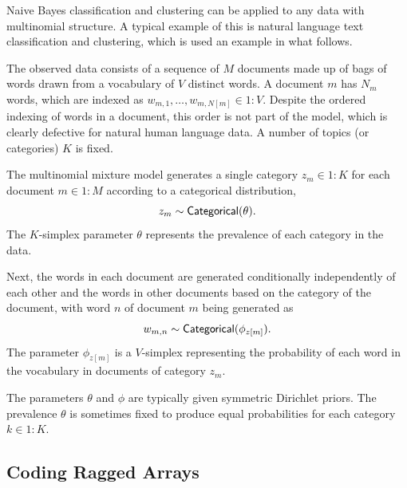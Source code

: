 Naive Bayes classification and clustering can be applied to any data
with multinomial structure.  A typical example of this is natural
language text classification and clustering, which is used an example
in what follows.

The observed data consists of a sequence of $M$ documents made up of
bags of words drawn from a vocabulary of $V$ distinct words.  A
document $m$ has $N_m$ words, which are indexed as $w_{m,1}, \ldots,
w_{m,N[m]} \in 1{:}V$.  Despite the ordered indexing of words in a
document, this order is not part of the model, which is clearly
defective for natural human language data.  A number of topics (or
categories) $K$ is fixed.

The multinomial mixture model generates a single category $z_m \in
1{:}K$ for each document $m \in 1{:}M$ according to a categorical
distribution,
\[
z_m \sim \mbox{\sf Categorical}(\theta).
\]
The $K$-simplex parameter $\theta$ represents the prevalence of each
category in the data.

Next, the words in each document are generated conditionally
independently of each other and the words in other documents based on
the category of the document, with word $n$ of document $m$ being
generated as
\[
w_{m,n} \sim \mbox{\sf Categorical}(\phi_{z[m]}).
\]
The parameter $\phi_{z[m]}$ is a $V$-simplex representing the
probability of each word in the vocabulary in documents of category
$z_m$.

The parameters $\theta$ and $\phi$ are typically given symmetric
Dirichlet priors.  The prevalence $\theta$ is sometimes fixed to
produce equal probabilities for each category $k \in 1:K$.

\subsection{Coding Ragged Arrays}

